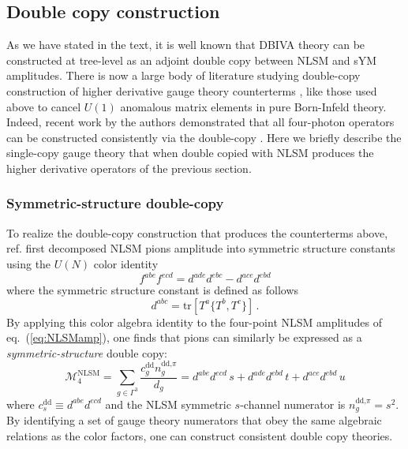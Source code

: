 \documentclass[12pt,letter]{article}
\def\eqn#1{eq.~(\ref{#1})}
\def\be{\begin{equation}}
\def\ee{\end{equation}}
\begin{document}
\subsection{Double copy construction}\label{sec:ActionDC}
As we have stated in the text, it is well known that DBIVA theory can be constructed at tree-level as an adjoint double copy between NLSM and sYM amplitudes. There is now a large body of literature studying double-copy construction of higher derivative gauge theory counterterms \cite{Carrasco:2019yyn,Carrasco:2021ptp,Chi:2021mio,Bonnefoy:2021qgu,Carrasco:2022lbm,Carrasco:2022sck,Pavao:2022kog,Chen:2022shl,Chen:2023dcx,Brown:2023srz}, like those used above to cancel $U(1)$ anomalous matrix elements in pure Born-Infeld theory. Indeed, recent work by the authors demonstrated that all four-photon operators can be constructed consistently via the double-copy \cite{Carrasco:2022jxn}. Here we briefly describe the single-copy gauge theory that when double copied with NLSM produces the higher derivative operators of the previous section. 
\subsubsection{Symmetric-structure double-copy}\label{sec:symDC}
To realize the double-copy construction that produces the counterterms above, ref. \cite{Carrasco:2022jxn} first decomposed NLSM pions amplitude into symmetric structure constants using the $U(N)$ color identity
\be
f^{abe}f^{ecd} = d^{ade}d^{ebc}- d^{ace}d^{ebd}
\ee
where the symmetric structure constant is defined as follows
\be
d^{abc} = \text{tr}[T^a\{T^b,T^c\}]\,.
\ee
By applying this color algebra identity to the four-point NLSM amplitudes of \eqn{eq:NLSMamp}, one finds that pions can similarly be expressed as a \textit{symmetric-structure} double copy:
\be
\mathcal{M}^{\text{NLSM}}_4 =  \sum_{g\in \Gamma^3} \frac{c_g^{\text{dd}}n^{\text{dd,}\pi}_g}{d_g}= d^{abe}d^{ecd}\,s+d^{ade}d^{ebd}\,t+d^{ace}d^{ebd}\,u 
\ee
where $c_s^{\text{dd}} \equiv d^{abe}d^{ecd}$ and the NLSM symmetric $s$-channel numerator is $n^{\text{dd,}\pi}_g=s^2$. By identifying a set of gauge theory numerators that obey the same algebraic relations as the color factors, one can construct consistent double copy theories. 
\end{document}
